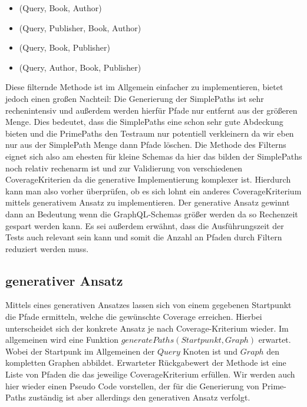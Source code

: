 \begin{itemize}
    \item (Query, Book, Author)
    \item (Query, Publisher, Book, Author)
    \item (Query, Book, Publisher)
    \item (Query, Author, Book, Publisher)
\end{itemize}

Diese filternde Methode ist im Allgemein einfacher zu implementieren, bietet jedoch einen großen Nachteil:
Die Generierung der SimplePaths ist sehr rechenintensiv und außerdem werden hierfür Pfade nur entfernt aus der größeren Menge.
Dies bedeutet, dass die SimplePaths eine schon sehr gute Abdeckung bieten und die PrimePaths den Testraum nur potentiell verkleinern da wir eben
nur aus der SimplePath Menge dann Pfade löschen.
Die Methode des Filterns eignet sich also am ehesten für kleine Schemas da hier das bilden der SimplePaths noch relativ rechenarm
ist und zur Validierung von verschiedenen CoverageKriterien da die generative Implementierung komplexer ist.
Hierdurch kann man also vorher überprüfen, ob es sich lohnt ein anderes CoverageKriterium mittels generativem Ansatz zu implementieren.
Der generative Ansatz gewinnt dann an Bedeutung wenn die GraphQL-Schemas größer werden da so Rechenzeit gespart werden kann.
Es sei außerdem erwähnt, dass die Ausführungszeit der Tests auch relevant sein kann und somit die Anzahl an Pfaden durch Filtern reduziert werden muss.

\subsection{generativer Ansatz}

Mittels eines generativen Ansatzes lassen sich von einem gegebenen Startpunkt die Pfade ermitteln, welche die gewünschte Coverage
erreichen.
Hierbei unterscheidet sich der konkrete Ansatz je nach Coverage-Kriterium wieder.
Im allgemeinen wird eine Funktion $generatePaths(Startpunkt, Graph)$ erwartet.
Wobei der Startpunk im Allgemeinen der $Query$ Knoten ist und $Graph$ den kompletten Graphen abbildet.
Erwarteter Rückgabewert der Methode ist eine Liste von Pfaden die das jeweilige CoverageKriterium erfüllen.
Wir werden auch hier wieder einen Pseudo Code vorstellen, der für die Generierung von Prime-Paths zuständig ist aber allerdings
den generativen Ansatz verfolgt.

